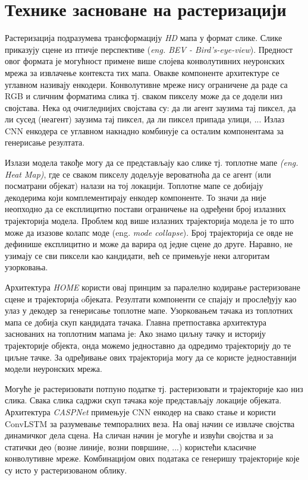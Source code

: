 \documentclass[11pt,oneside]{memoir}
\begin{document}
\section{Технике засноване на растеризацији}

Растеризација подразумева трансформацију \textit{HD} мапа у формат слике. Слике приказују сцене из птичје перспективе (\textit{eng. BEV - Bird's-eye-view}).
Предност овог формата је могућност примене више слојева конволутивних неуронских мрежа за извлачење 
контекста тих мапа. Овакве компоненте архитектуре се углавном називају енкодери. Конволутивне мреже нису ограничене да раде са RGB 
и сличним форматима слика тј. сваком пикселу може да се додели низ својстава. Нека од очигледнијих својстава су: да ли агент заузима тај пиксел, 
да ли сусед (неагент) заузима тај пиксел,
да ли пиксел припада улици, ... Излаз CNN енкодера се углавном накнадно комбинује са осталим компонентама за генерисање резултата. 

Излази модела такође могу да се представљају као слике тј. топлотне мапе \textit{(eng. Heat Map)}, где се сваком пикселу додељује вероватноћа
да се агент (или посматрани објекат) налази на тој локацији. Топлотне мапе се добијају декодерима који комплементирају енкодер компоненте.
То значи да није неопходно да се експлицитно постави ограничење на одређени број излазних трајекторија модела. Проблем
код више излазних трајекторија модела је то што може да изазове колапс моде (eng. \textit{mode collapse}). Број трајекторија се овде не 
дефинише експлицитно и може да варира од једне сцене до друге. Наравно, не узимају се сви пиксели као кандидати, већ се примењује неки
алгоритам узорковања. \cite{home} \cite{centernet}

Архитектура \textit{HOME} \cite{home} користи овај принцим за паралелно кодирање растеризоване сцене и трајекторија oбјеката. Резултати
компоненти се спајају и прослеђују као улаз у декодер за генерисање топлотне мапе. Узорковањем тачака из топлотних мапа се добија скуп кандидата тачака.
Главна претпоставка архитектура заснованих на топлотним мапама је: Ако знамо циљну тачку и историју трајекторије објекта, онда можемо
једноставно да одредимо трајекторију до те циљне тачке. За одређивање ових трајекторија могу да се користе једноставнији модели неуронских мрежа.

Могуће је растеризовати потпуно податке тј. растеризовати и трајекторије као низ слика. Свака слика садржи скуп тачака које представљају
локације објеката. Архитектура \textit{CASPNet} \cite{caspnet} примењује CNN енкодер на свако стање и користи ConvLSTM \cite{convlstm} за разумевање
темпоралних веза. На овај начин се извлаче својства динамичког дела сцена. На сличан начин је могуће и извући својства и за 
статички део (возне линије, возни површине, ...) користећи класичне конволутивне мреже. Комбинацијом ових података се генеришу
трајекторије које су исто у растеризованом облику.
\end{document}
